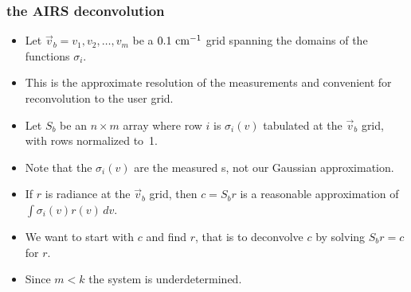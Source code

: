 \documentclass[10pt]{beamer}
\begin{document}
\begin{frame}
\begin{columns}[t]
\begin{column}{0.5\textwidth}
\end{column}
\end{columns}
\end{frame}
\begin{frame}
\frametitle{the AIRS deconvolution}
\begin{itemize}

  \item Let $\vec v_b = v_1,v_2,\ldots,v_m$ be a $0.1~\mbox{cm$^{-1}$}$ grid
    spanning the domains of the functions $\sigma_i$.

  \item This is the approximate resolution of the {\srf}
    measurements and convenient for reconvolution to the {\cris}
    user grid.

  \item Let $S_b$ be an $n\times m$ array where row $i$ is
    $\sigma_i(v)$ tabulated at the $\vec v_b$ grid, with rows
    normalized to~1.

  \item Note that the $\sigma_i(v)$ are the measured {\srf}s, not
    our Gaussian approximation.

  \item If $r$ is radiance at the $\vec v_b$ grid, then $c = S_b r$
    is a reasonable approximation of $\int\sigma_i(v)r(v)\,dv$.

  \item We want to start with $c$ and find $r$, that is to
    deconvolve $c$ by solving $S_b r = c$ for $r$.  

  \item Since $m < k$ the system is underdetermined.  

\end{itemize}
\end{frame}
\end{document}
